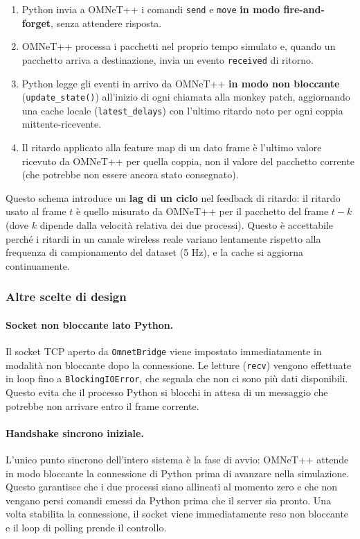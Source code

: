 \documentclass[12pt,a4paper]{article}
\begin{document}
\begin{enumerate}
  \item Python invia a OMNeT++ i comandi \texttt{send} e \texttt{move} \textbf{in modo
        fire-and-forget}, senza attendere risposta.
  \item OMNeT++ processa i pacchetti nel proprio tempo simulato e, quando un pacchetto
        arriva a destinazione, invia un evento \texttt{received} di ritorno.
  \item Python legge gli eventi in arrivo da OMNeT++ \textbf{in modo non bloccante}
        (\texttt{update\_state()}) all'inizio di ogni chiamata alla monkey patch,
        aggiornando una cache locale (\texttt{latest\_delays}) con l'ultimo ritardo
        noto per ogni coppia mittente-ricevente.
  \item Il ritardo applicato alla feature map di un dato frame \`e l'ultimo valore
        ricevuto da OMNeT++ per quella coppia, non il valore del pacchetto corrente
        (che potrebbe non essere ancora stato consegnato).
\end{enumerate}

Questo schema introduce un \textbf{lag di un ciclo} nel feedback di ritardo: il ritardo
usato al frame $t$ \`e quello misurato da OMNeT++ per il pacchetto del frame $t-k$
(dove $k$ dipende dalla velocit\`a relativa dei due processi). Questo \`e accettabile
perch\'e i ritardi in un canale wireless reale variano lentamente rispetto alla frequenza
di campionamento del dataset (5 Hz), e la cache si aggiorna continuamente.

\subsubsection{Altre scelte di design}

\paragraph{Socket non bloccante lato Python.}
Il socket TCP aperto da \texttt{OmnetBridge} viene impostato immediatamente in modalit\`a
non bloccante dopo la connessione. Le letture (\texttt{recv}) vengono effettuate in loop
fino a \texttt{BlockingIOError}, che segnala che non ci sono pi\`u dati disponibili.
Questo evita che il processo Python si blocchi in attesa di un messaggio che potrebbe non
arrivare entro il frame corrente.

\paragraph{Handshake sincrono iniziale.}
L'unico punto sincrono dell'intero sistema \`e la fase di avvio: OMNeT++ attende in modo
bloccante la connessione di Python prima di avanzare nella simulazione. Questo garantisce
che i due processi siano allineati al momento zero e che non vengano persi comandi emessi
da Python prima che il server sia pronto. Una volta stabilita la connessione, il socket
viene immediatamente reso non bloccante e il loop di polling prende il controllo.
\end{document}
